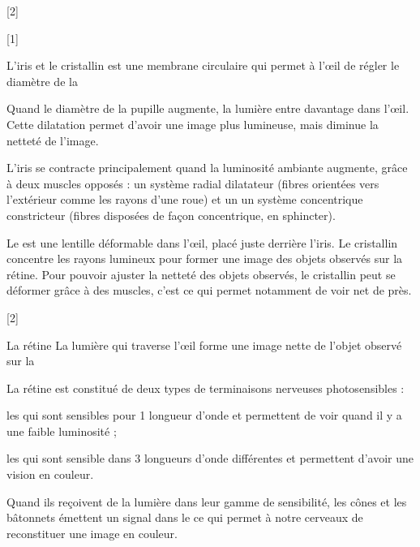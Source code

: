 [2]

[1]


\begin{doc}{L'iris et le cristallin}
   est une membrane circulaire qui permet à l’œil de régler le diamètre de la  
  
  Quand le diamètre de la pupille augmente, la lumière entre davantage dans l’œil.
  Cette dilatation permet d'avoir une image plus lumineuse, mais diminue la netteté de l'image.

  L'iris se contracte principalement quand la luminosité ambiante augmente, grâce à deux muscles opposés : un système radial dilatateur (fibres orientées vers l'extérieur comme les rayons d'une roue) et un un système concentrique constricteur (fibres disposées de façon concentrique, en sphincter).

  Le  est une lentille déformable dans l'œil, placé juste derrière l'iris.
  Le cristallin concentre les rayons lumineux pour former une image des objets observés sur la rétine.
  Pour pouvoir ajuster la netteté des objets observés, le cristallin peut se déformer grâce à des muscles, c'est ce qui permet notamment de voir net de près.
\end{doc}

[2]


\begin{doc}{La rétine}
  La lumière qui traverse l’œil forme une image nette de l'objet observé sur la 

  
  La rétine est constitué de deux types de terminaisons nerveuses photosensibles :
  \begin{listePoints}
    \item les  qui sont sensibles pour 1 longueur d'onde et permettent de voir quand il y a une faible luminosité ;
    \item les  qui sont sensible dans 3 longueurs d'onde différentes et permettent d'avoir une vision en couleur.
  \end{listePoints}
  Quand ils reçoivent de la lumière dans leur gamme de sensibilité, les cônes et les bâtonnets émettent un signal dans le  ce qui permet à notre cerveaux de reconstituer une image en couleur.
\end{doc}

